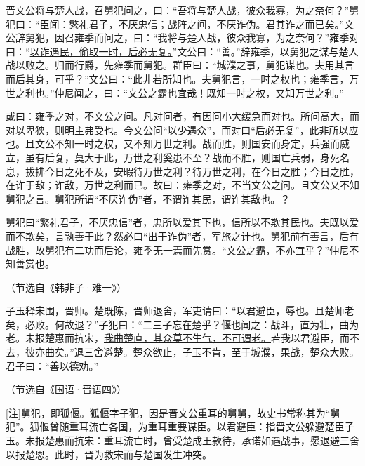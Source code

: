 \documentclass[11pt,a4paper]{ctexart}
\begin{document}
\begin{materialtext}
晋文公将与楚人战，召舅犯问之，曰：“吾将与楚人战，彼众我寡，为之奈何？”舅犯曰：“臣闻：繁礼君子，不厌忠信；战阵之间，不厌诈伪。君其诈之而已矣。”文公辞舅犯，因召雍季而问之，曰：“我将与楚人战，彼众我寡，为之奈何？”雍季对曰：“\uline{以诈遇民，偷取一时，后必无复。}”文公曰：“善。”辞雍季，以舅犯之谋与楚人战以败之。归而行爵，先雍季而舅犯。群臣曰：“城濮之事，舅犯谋也。夫用其言而后其身，可乎？”文公曰：“此非若所知也。夫舅犯言，一时之权也；雍季言，万世之利也。”仲尼闻之，曰：“文公之霸也宜哉！既知一时之权，又知万世之利。”

或曰：雍季之对，不文公之问。凡对问者，有因问小大缓急而对也。所问高大，而对以卑狭，则明主弗受也。今文公问“以少遇众”，而对曰“后必无复”，此非所以应也。且文公不知一时之权，又不知万世之利。战而胜，则国安而身定，兵强而威立，虽有后复，莫大于此，万世之利奚患不至？战而不胜，则国亡兵弱，身死名息，拔拂今日之死不及，安暇待万世之利？待万世之利，在今日之胜；今日之胜，在诈于敌；诈敌，万世之利而已。故曰：雍季之对，不当文公之问。且文公又不知舅犯之言。舅犯所谓“不厌诈伪”者，不谓诈其民，谓诈其敌也。？

舅犯曰“繁礼君子，不厌忠信”者，忠所以爱其下也，信所以不欺其民也。夫既以爱而不欺矣，言孰善于此？然必曰“出于诈伪”者，军旅之计也。舅犯前有善言，后有战胜，故舅犯有二功而后论，雍季无一焉而先赏。“文公之霸，不亦宜乎？”仲尼不知善赏也。
\end{materialtext}
\begin{flushright}（节选自《韩非子·难一》）\end{flushright}

\begin{materialtext}
子玉释宋围，晋师。楚既陈，晋师退舍，军吏请曰：“以君避臣，辱也。且楚师老矣，必败。何故退？”子犯曰：“二三子忘在楚乎？偃也闻之：战斗，直为壮，曲为老。未报楚惠而抗宋，\uline{我曲楚直，其众莫不生气，不可谓老。}若我以君避臣，而不去，彼亦曲矣。”退三舍避楚。楚众欲止，子玉不肯，至于城濮，果战，楚众大败。君子曰：“善以德劝。”
\end{materialtext}
\begin{flushright}（节选自《国语·晋语四》）\end{flushright}

[注]舅犯，即狐偃。狐偃字子犯，因是晋文公重耳的舅舅，故史书常称其为“舅犯”。狐偃曾随重耳流亡各国，为重耳重要谋臣。以君避臣：指晋文公躲避楚臣子玉。未报楚惠而抗宋：重耳流亡时，曾受楚成王款待，承诺如遇战事，愿退避三舍以报楚恩。此时，晋为救宋而与楚国发生冲突。
\end{document}
